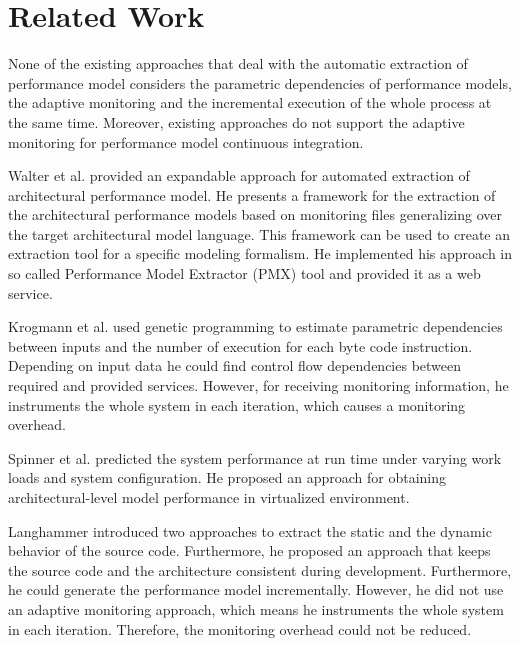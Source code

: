 
\chapter{Related Work}
\label{ch:Related Work}

None of the existing approaches that deal with the automatic extraction of performance
model considers the parametric dependencies of performance models, the adaptive
monitoring and the incremental execution of the whole process at the same time. Moreover,
existing approaches do not support the adaptive monitoring for performance model continuous
integration.

Walter et al. \cite{walter2017expandable} provided an expandable approach for automated extraction of
architectural performance model. He presents a framework for the extraction of
the architectural performance models based on monitoring files generalizing over
the target architectural model language. This framework can be used to create
an extraction tool for a specific modeling formalism. He implemented his approach
in so called Performance Model Extractor (PMX) tool and provided it as a web service.

Krogmann et al. \cite{krogmann2012reconstruction, krogmann2010using} used genetic programming to estimate parametric dependencies between inputs and the number of execution for each byte code instruction.
Depending on input data he could find control flow dependencies between required
and provided services. However, for receiving monitoring information, he instruments the whole system in each iteration, which causes a monitoring overhead. 

Spinner et al. \cite{spinner2016reference} predicted the system performance at run time under varying work
loads and system configuration. He proposed an approach for obtaining architectural-level model performance in virtualized environment.

Langhammer \cite{langhammer2017automated} introduced two approaches to extract the static and the dynamic
behavior of the source code. Furthermore, he proposed an approach that keeps the source code and the 
architecture consistent during development. Furthermore, he could generate the performance model incrementally. However, he did not use an adaptive monitoring approach, which means he instruments the whole system in each iteration. Therefore, the monitoring overhead could not be reduced.

